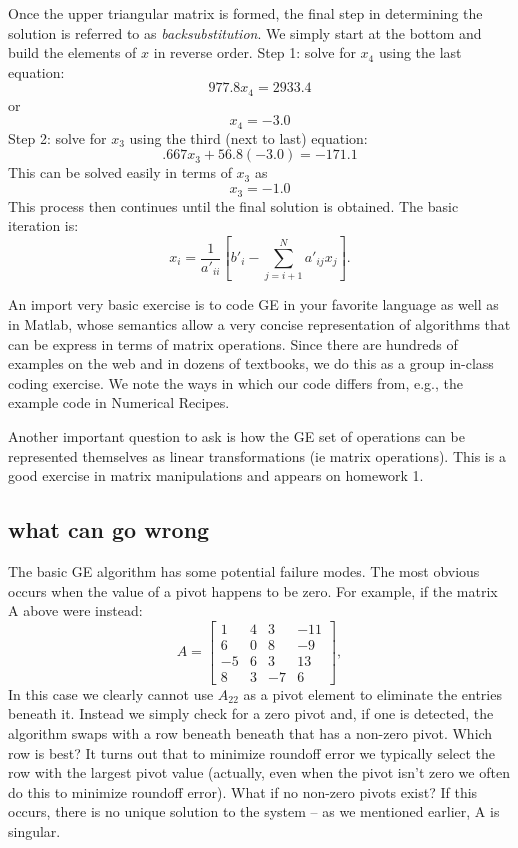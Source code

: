 \documentclass[11pt]{article}
\begin{document}
Once the upper triangular matrix is formed, the final step in determining the solution is referred to as {\it backsubstitution}. 
We simply start at the bottom and build the elements of $x$ in reverse order.
Step 1: solve for $x_4$ using the last equation:
$$977.8x_4 = 2933.4$$ or $$x_4 = -3.0$$
Step 2: solve for $x_3$ using the third (next to last) equation:
$$.667 x_3 + 56.8 (-3.0)= -171.1$$
This can be solved easily in terms of $x_3$ as $$x_3 = -1.0$$
This process then continues until the final solution is obtained.
The basic iteration is:
\begin{equation}
x_i = \frac{1}{a'_{ii}}\left[ b'_i - \sum_{j=i+1}^N a'_{ij}x_j\right].
\end{equation}

An import very basic exercise is to code GE in your favorite language
as well as in Matlab, whose semantics allow a very concise representation
of algorithms that can be express in terms of matrix operations. Since there
are hundreds of examples on the web and in dozens of textbooks, we
do this as a group in-class coding exercise. We note the ways in which
our code differs from, e.g., the example code in Numerical Recipes.

Another important question to ask is how the GE set of operations can
be represented themselves as linear transformations (ie matrix operations).
This is a good exercise in matrix manipulations and appears on homework 1.

\subsection{what can go wrong}
The basic GE algorithm has some potential failure modes. The most
obvious occurs when the value of a pivot happens to be zero. For example,
if the matrix A above were instead:
\[
A = 
\begin{bmatrix}
1 & 4 & 3 & -11 \\
6 & 0 & 8 & -9 \\
-5 & 6 & 3 & 13 \\
8 & 3 & -7 & 6 
\end{bmatrix},
\]
In this case we clearly cannot use $A_{22}$ as a pivot element to eliminate the entries beneath
it. Instead we simply check for a zero pivot and, if one is detected, the algorithm swaps with a row beneath
beneath that has a non-zero pivot. Which row is best? It turns out that to minimize roundoff error we 
typically select the row with the largest pivot value (actually, even when the pivot isn't zero we often
do this to minimize roundoff error). What if no non-zero pivots exist? If this occurs, there is no unique
solution to the system -- as we mentioned earlier, A is singular.
\end{document}
